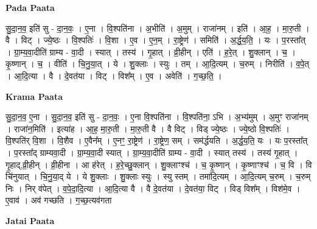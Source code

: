 \documentclass[17pt]{extarticle}
\begin{document}
\textbf{Pada Paata} \newline

सु॒दा॒न॒व॒ इति॑ सु - दा॒न॒वः॒ । ए॒ना । वि॒श्पति॑ना । अ॒भीति॑ । अ॒मुम् । राजा॑नम् । इति॑ । आ॒ह॒ । मा॒रु॒ती । वै । विट् । ज्ये॒ष्ठः । वि॒श्पतिः॑ । वि॒शा । ए॒व । ए॒न॒म् । रा॒ष्ट्रेण॑ । समिति॑ । अ॒र्द्ध॒य॒ति॒ । यः । प॒रस्ता᳚त् । ग्रा॒म्य॒वा॒दीति॑ ग्राम्य - वा॒दी । स्यात् । तस्य॑ । गृ॒हात् । व्री॒हीन् । एति॑ । ह॒रे॒त् । शु॒क्लान् । च॒ । कृ॒ष्णान् । च॒ । वीति॑ । चि॒नु॒या॒त् । ये । शु॒क्लाः । स्युः । तम् । आ॒दि॒त्यम् । च॒रुम् । निरीति॑ । व॒पे॒त् । आ॒दि॒त्या । वै । दे॒वत॑या । विट् । विश᳚म् । ए॒व । अवेति॑ । ग॒च्छ॒ति॒ ।  \newline


\textbf{Krama Paata} \newline

सु॒दा॒न॒व॒ ए॒ना । सु॒दा॒न॒व॒ इति॑ सु - दा॒न॒वः॒ । ए॒ना वि॒श्पति॑ना । वि॒श्पति॑ना॒ ऽभि । अ॒भ्य॑मुम् । अ॒मुꣳ राजा॑नम् । राजा॑न॒मिति॑ । इत्या॑ह । आ॒ह॒ मा॒रु॒ती । मा॒रु॒ती वै । वै विट् । विड् ज्ये॒ष्ठः । ज्ये॒ष्ठो वि॒श्पतिः॑ । वि॒श्पति॑र् वि॒शा । वि॒शैव । ए॒वैन᳚म् । ए॒नꣳ॒॒ रा॒ष्ट्रेण॑ । रा॒ष्ट्रेण॒ सम् । सम॑र्द्धयति । अ॒र्द्ध॒य॒ति॒ यः । यः प॒रस्ता᳚त् । प॒रस्ता᳚द् ग्राम्यवा॒दी । ग्रा॒म्य॒वा॒दी स्यात् । ग्रा॒म्य॒वा॒दीति॑ ग्राम्य - वा॒दी । स्यात् तस्य॑ । तस्य॑ गृ॒हात् । गृ॒हाद्,व्री॒हीन् । व्री॒हीना । आ ह॑रेत् । ह॒रे॒च्छु॒क्लान् । शु॒क्लाꣳश्च॑ । च॒ कृ॒ष्णान् । कृ॒ष्णाꣳश्च॑ । च॒ वि । वि चि॑नुयात् । चि॒नु॒या॒द् ये । ये शु॒क्लाः । शु॒क्लाः स्युः । स्यु स्तम् । तमा॑दि॒त्यम् । आ॒दि॒त्यम् च॒रुम् । च॒रुम् निः । निर् व॑पेत् । व॒पे॒दा॒दि॒त्या । आ॒दि॒त्या वै । वै दे॒वत॑या । दे॒वत॑या॒ विट् । विड् विश᳚म् । विश॑मे॒व । ए॒वाव॑ । अव॑ गच्छति । ग॒च्छ॒त्यव॑गता \newline

\textbf{Jatai Paata} \newline
\end{document}
